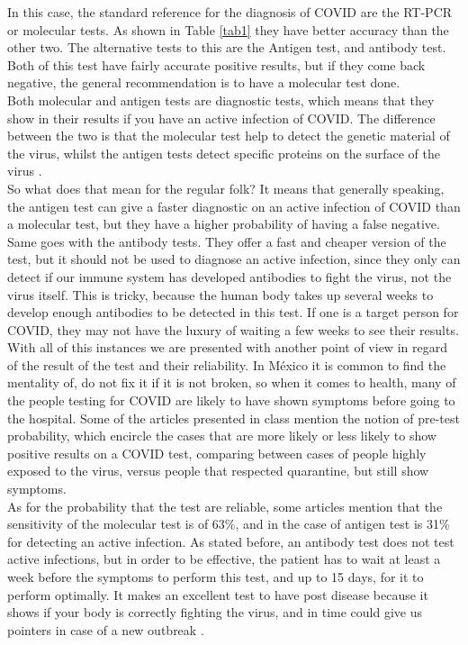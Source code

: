 \documentclass{article}
\begin{document}
In this case, the standard reference for the diagnosis of COVID are the RT-PCR or molecular tests. As shown in Table \ref{tab1} they have better accuracy than the other two. The alternative tests to this are the Antigen test, and antibody test. Both of this test have fairly accurate positive results, but if they come back negative, the general recommendation is to have a molecular test done.\\

Both molecular and antigen tests are diagnostic tests, which means that they show in their results if you have an active infection of COVID. The difference between the two is that the molecular test help to detect the genetic material of the virus, whilst the antigen tests detect specific proteins on the surface of the virus \cite{fda1}.\\

So what does that mean for the regular folk? It means that generally speaking, the antigen test can give a faster diagnostic on an active infection of COVID than a molecular test, but they have a higher probability of having a false negative.\\ 

Same goes with the antibody tests. They offer a fast and cheaper version of the test, but it should not be used to diagnose an active infection, since they only can detect if our immune system has developed antibodies to fight the virus, not the virus itself. This is tricky, because the human body takes up several weeks to develop enough antibodies to be detected in this test. If one is a target person for COVID, they may not have the luxury of waiting a few weeks to see their results.\\

With all of this instances we are presented with another point of view in regard of the result of the test and their reliability. In M\'exico it is common to find the mentality of, do not fix it if it is not broken, so when it comes to health, many of the people testing for COVID are likely to have shown symptoms before going to the hospital. Some of the articles presented in class mention the notion of pre-test probability, which encircle the cases that are more likely or less likely to show positive results on a COVID test, comparing between cases of people highly exposed to the virus, versus people that respected quarantine, but still show symptoms.\\

As for the probability that the test are reliable, some articles mention that the sensitivity of the molecular test is of 63\%, and in the case of antigen test is 31\% for detecting an active infection. As stated before, an antibody test does not test active infections, but in order to be effective, the patient has to wait at least a week before the symptoms to perform this test, and up to 15 days, for it to perform optimally. It makes an excellent test to have post disease because it shows if your body is correctly fighting the virus, and in time could give us pointers in case of a new outbreak \cite{chan2020}.\\
\end{document}
